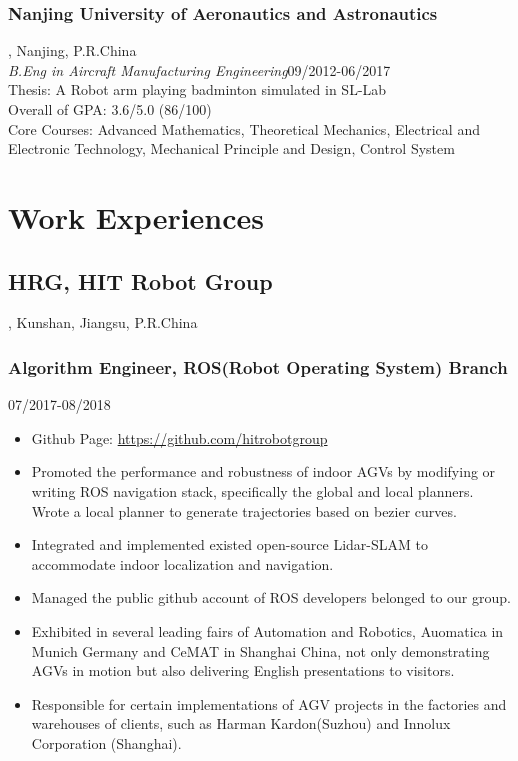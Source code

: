 \documentclass{article}
\begin{document}
\subsubsection{Nanjing University of Aeronautics and Astronautics}
, Nanjing, P.R.China\\
\emph{B.Eng in Aircraft Manufacturing Engineering}{\hfill09/2012-06/2017\\}
Thesis: A Robot arm playing badminton simulated in SL-Lab\\
Overall of GPA: 3.6/5.0 (86/100)\\
Core Courses: Advanced Mathematics, Theoretical Mechanics, Electrical and Electronic Technology, Mechanical Principle and Design, Control System

\section{Work Experiences}
\subsection{HRG, HIT Robot Group}, Kunshan, Jiangsu, P.R.China
\subsubsection{Algorithm Engineer, ROS(Robot Operating System) Branch} \hfill 07/2017-08/2018
\begin{itemize}[noitemsep,topsep=1pt]
\item Github Page: \url{https://github.com/hitrobotgroup}
\item Promoted the performance and robustness of indoor AGVs by modifying or writing ROS navigation stack, specifically the global and local planners. Wrote a local planner to generate trajectories based on bezier curves.
\item Integrated and implemented existed open-source Lidar-SLAM to accommodate indoor localization and navigation.
\item Managed the public github account of ROS developers belonged to our group.  
\item Exhibited in several leading fairs of Automation and Robotics, Auomatica in Munich Germany and CeMAT in Shanghai China, not only demonstrating AGVs in motion but also delivering English presentations to visitors. 
\item Responsible for certain implementations of AGV projects in the factories and warehouses of clients, such as Harman Kardon(Suzhou) and Innolux Corporation (Shanghai).  
\end{itemize}
\end{document}
